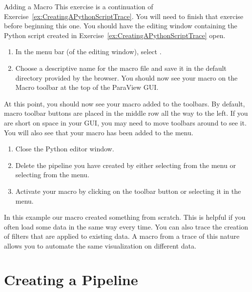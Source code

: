 \begin{exercise}{Adding a Macro}
  \label{ex:AddingAMacro}%
  This exercise is a continuation of
  Exercise~\ref{ex:CreatingAPythonScriptTrace}.  You will need to finish
  that exercise before beginning this one.  You should have the editing
  window containing the Python script created in
  Exercise~\ref{ex:CreatingAPythonScriptTrace} open.

  \begin{enumerate}
  \item In the menu bar (of the editing window), select  \ra
    .
  \item Choose a descriptive name for the macro file and save it in the
    default directory provided by the browser.  You should now see 
    your macro on the Macro toolbar at the top of the ParaView GUI.
    \savecounter
  \end{enumerate}

  At this point, you should now see your macro added to the toolbars.  By
  default, macro toolbar buttons are placed in the middle row all the way
  to the left.  If you are short on space in your GUI, you may need to move
  toolbars around to see it.  You will also see that your macro has been
  added to the  menu.

  \begin{enumerate}
    \restorecounter
  \item Close the Python editor window.
  \item Delete the pipeline you have created by either selecting 
    \ra {} from the menu or selecting  \ra
     from the menu.
  \item Activate your macro by clicking on the toolbar button or selecting
    it in the  menu.
  \end{enumerate}

  In this example our macro created something from scratch.  This is
  helpful if you often load some data in the same way every time.  You can
  also trace the creation of filters that are applied to existing data.  A
  macro from a trace of this nature allows you to automate the same
  visualization on different data.
\end{exercise}


\section{Creating a Pipeline}
\label{sec:CreatingAPipeline}

